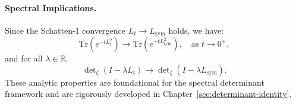 \begin{lemma}
\paragraph{Spectral Implications.}
Since the Schatten-1 convergence \( L_t \to L_{\mathrm{sym}} \) holds, we have:
\[
\mathrm{Tr}\left(e^{-tL_t^2}\right) \to \mathrm{Tr}\left(e^{-tL_{\mathrm{sym}}^2}\right), \quad \text{as } t \to 0^+,
\]
and for all \( \lambda \in \mathbb{R} \),
\[
\det\nolimits_{\zeta}(I - \lambda L_t) \to \det\nolimits_{\zeta}(I - \lambda L_{\mathrm{sym}}).
\]
These analytic properties are foundational for the spectral determinant framework and are rigorously developed in Chapter~\ref{sec:determinant-identity}.
\end{lemma}
% 